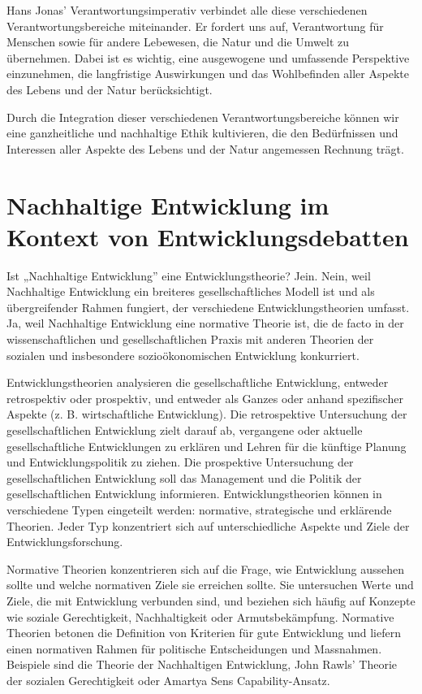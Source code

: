 \documentclass[
  nswissgerman,
  a4paper,
  openany]{book}
\begin{document}
Hans Jonas' Verantwortungsimperativ verbindet alle diese verschiedenen
Verantwortungsbereiche miteinander. Er fordert uns auf, Verantwortung
für Menschen sowie für andere Lebewesen, die Natur und die Umwelt zu
übernehmen. Dabei ist es wichtig, eine ausgewogene und umfassende
Perspektive einzunehmen, die langfristige Auswirkungen und das
Wohlbefinden aller Aspekte des Lebens und der Natur berücksichtigt.

Durch die Integration dieser verschiedenen Verantwortungsbereiche können
wir eine ganzheitliche und nachhaltige Ethik kultivieren, die den
Bedürfnissen und Interessen aller Aspekte des Lebens und der Natur
angemessen Rechnung trägt.

\section{Nachhaltige Entwicklung im Kontext von
Entwicklungsdebatten}\label{nachhaltige-entwicklung-im-kontext-von-entwicklungsdebatten}

Ist „Nachhaltige Entwicklung'' eine Entwicklungstheorie? Jein. Nein,
weil Nachhaltige Entwicklung ein breiteres gesellschaftliches Modell ist
und als übergreifender Rahmen fungiert, der verschiedene
Entwicklungstheorien umfasst. Ja, weil Nachhaltige Entwicklung eine
normative Theorie ist, die de facto in der wissenschaftlichen und
gesellschaftlichen Praxis mit anderen Theorien der sozialen und
insbesondere sozioökonomischen Entwicklung konkurriert.

Entwicklungstheorien analysieren die gesellschaftliche Entwicklung,
entweder retrospektiv oder prospektiv, und entweder als Ganzes oder
anhand spezifischer Aspekte (z. B. wirtschaftliche Entwicklung). Die
retrospektive Untersuchung der gesellschaftlichen Entwicklung zielt
darauf ab, vergangene oder aktuelle gesellschaftliche Entwicklungen zu
erklären und Lehren für die künftige Planung und Entwicklungspolitik zu
ziehen. Die prospektive Untersuchung der gesellschaftlichen Entwicklung
soll das Management und die Politik der gesellschaftlichen Entwicklung
informieren. Entwicklungstheorien können in verschiedene Typen
eingeteilt werden: normative, strategische und erklärende Theorien.
Jeder Typ konzentriert sich auf unterschiedliche Aspekte und Ziele der
Entwicklungsforschung.

Normative Theorien konzentrieren sich auf die Frage, wie Entwicklung
aussehen sollte und welche normativen Ziele sie erreichen sollte. Sie
untersuchen Werte und Ziele, die mit Entwicklung verbunden sind, und
beziehen sich häufig auf Konzepte wie soziale Gerechtigkeit,
Nachhaltigkeit oder Armutsbekämpfung. Normative Theorien betonen die
Definition von Kriterien für gute Entwicklung und liefern einen
normativen Rahmen für politische Entscheidungen und Massnahmen.
Beispiele sind die Theorie der Nachhaltigen Entwicklung, John Rawls'
Theorie der sozialen Gerechtigkeit oder Amartya Sens Capability-Ansatz.
\end{document}
